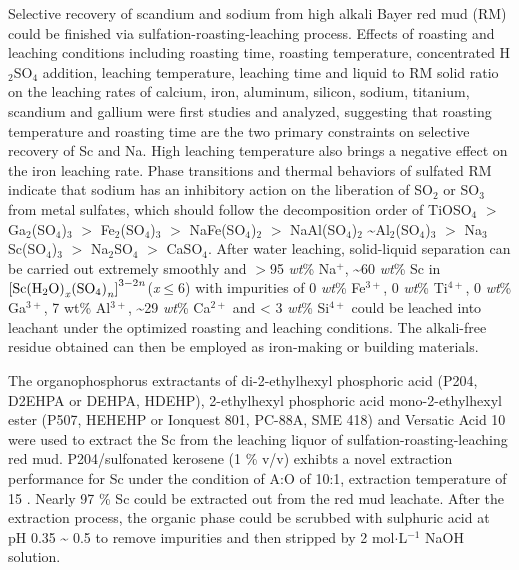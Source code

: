 \begin{eabstract}
Selective recovery of scandium and sodium from high alkali Bayer red mud (RM) could be finished via sulfation-roasting-leaching process. Effects of roasting and leaching conditions including roasting time, roasting temperature, concentrated H$ _{\mathrm{2}} $SO$ _{\mathrm{4}} $ addition, leaching temperature, leaching time and liquid to RM solid ratio on the leaching rates of calcium, iron, aluminum, silicon, sodium, titanium, scandium and gallium were first studies and analyzed, suggesting that roasting temperature and roasting time are the two primary constraints on selective recovery of Sc and Na. High leaching temperature also brings a negative effect on the iron leaching rate. Phase transitions and thermal behaviors of sulfated RM indicate that sodium has an inhibitory action on the liberation of SO$ _{\mathrm{2}} $ or SO$ _{\mathrm{3}} $ from metal sulfates, which should follow the decomposition order of TiOSO$ _{\mathrm{4}} $ $ > $ Ga$ _{\mathrm{2}} $(SO$ _{\mathrm{4}} $)$ _{\mathrm{3}} $ $ > $ Fe$ _{\mathrm{2}} $(SO$ _{\mathrm{4}} $)$ _{\mathrm{3}} $ $ > $ NaFe(SO$ _{\mathrm{4}} $)$ _{\mathrm{2}} $ $ > $ NaAl(SO$ _{\mathrm{4}} $)$ _{\mathrm{2}} $ \textasciitilde Al$ _{\mathrm{2}} $(SO$ _{\mathrm{4}} $)$ _{\mathrm{3}} $ $ > $ Na$ _{\mathrm{3}} $Sc(SO$ _{\mathrm{4}} $)$ _{\mathrm{3}} $ $ > $ Na$ _{\mathrm{2}} $SO$ _{\mathrm{4}} $ $ > $ CaSO$ _{\mathrm{4}} $. After water leaching, solid-liquid separation can be carried out extremely smoothly and $ > $95 \textit{wt}\% Na$ ^{\mathrm{+}} $, \textasciitilde 60 \textit{wt}\% Sc in  ${\left[ {{\rm{Sc(}}{{\rm{H}}_{\rm{2}}}{\rm{O}}{{\rm{)}}_\mathit{x}}{{{\rm{(S}}{{\rm{O}}_{\rm{4}}}{\rm{)}}}_\mathit{n}}} \right]^{\rm{3 - 2\mathit{n}}}}$(\textit{x}$ \leq $6) with impurities of 0 \textit{wt}\% Fe$ ^{\mathrm{3+}} $, 0 \textit{wt}\% Ti$ ^{\mathrm{4+}} $, 0 \textit{wt}\% Ga$ ^{\mathrm{3+}} $, 7 wt\% Al$ ^{\mathrm{3+}} $, \textasciitilde 29 \textit{wt}\% Ca$ ^{\mathrm{2+}} $ and < 3 \textit{wt}\% Si$ ^{\mathrm{4+}} $ could be leached into leachant under the optimized roasting and leaching conditions. The alkali-free residue obtained can then be employed as iron-making or building materials.

The organophosphorus extractants of di-2-ethylhexyl phosphoric acid (P204, D2EHPA or DEHPA, HDEHP), 2-ethylhexyl phosphoric acid mono-2-ethylhexyl ester  (P507, HEHEHP or Ionquest 801, PC-88A, SME 418) and
Versatic Acid 10 were used to extract the Sc from the leaching liquor of sulfation-roasting-leaching red mud. P204/sulfonated kerosene (1 \% v/v) exhibts a novel extraction performance for Sc under the condition of A:O of 10:1, extraction temperature of 15 \textcelsius. Nearly 97 \% Sc could be extracted out from the red mud leachate. After the extraction process, the organic phase could be scrubbed with  sulphuric acid at pH 0.35 \textasciitilde{ }0.5 to remove impurities and then stripped by 2 mol$ \cdot $L$ ^{\mathrm{-1}} $ NaOH solution. 

\end{eabstract}
\vfill
{}

\printnomenclature{}%